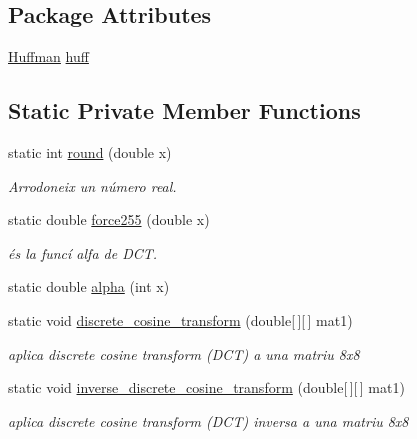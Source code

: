 \subsection*{Package Attributes}
\begin{DoxyCompactItemize}
\item 
\hyperlink{classHuffman}{Huffman} \hyperlink{classdomini_1_1algorithm_1_1JPEG_aacc6445baa7819e3f9139ffb78e0b8f4}{huff}
\end{DoxyCompactItemize}
\subsection*{Static Private Member Functions}
\begin{DoxyCompactItemize}
\item 
static int \hyperlink{classdomini_1_1algorithm_1_1JPEG_aa9c52789d61d5eebdeb13ee39f8e817d}{round} (double x)
\begin{DoxyCompactList}\small\item\em Arrodoneix un número real. \end{DoxyCompactList}\item 
static double \hyperlink{classdomini_1_1algorithm_1_1JPEG_af86bdbb6b6f5671abff6bc6bd5f6349d}{force255} (double x)
\begin{DoxyCompactList}\small\item\em és la funcí alfa de D\+CT. \end{DoxyCompactList}\item 
static double \hyperlink{classdomini_1_1algorithm_1_1JPEG_a058b0ee7eb44bbaec4078b5fc32c5107}{alpha} (int x)
\item 
static void \hyperlink{classdomini_1_1algorithm_1_1JPEG_a367e6d1e6543bf3d8c847aae36f4b6bf}{discrete\+\_\+cosine\+\_\+transform} (double\mbox{[}$\,$\mbox{]}\mbox{[}$\,$\mbox{]} mat1)
\begin{DoxyCompactList}\small\item\em aplica discrete cosine transform (D\+CT) a una matriu 8x8 \end{DoxyCompactList}\item 
static void \hyperlink{classdomini_1_1algorithm_1_1JPEG_a3a6e16b0ee34746e4b0118ed9107bd75}{inverse\+\_\+discrete\+\_\+cosine\+\_\+transform} (double\mbox{[}$\,$\mbox{]}\mbox{[}$\,$\mbox{]} mat1)
\begin{DoxyCompactList}\small\item\em aplica discrete cosine transform (D\+CT) inversa a una matriu 8x8 \end{DoxyCompactList}\item 

\end{DoxyCompactItemize}
